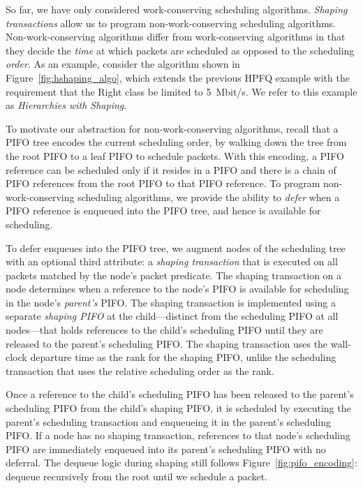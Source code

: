 So far, we have only considered work-conserving scheduling algorithms. {\em
Shaping transactions} allow us to program non-work-conserving scheduling
algorithms. Non-work-conserving algorithms differ from work-conserving
algorithms in that they decide the {\em time} at which packets are scheduled as
opposed to the scheduling {\em order}. As an example, consider the algorithm
shown in Figure~\ref{fig:hshaping_algo}, which extends the previous HPFQ
example with the requirement that the Right class be limited to 5~Mbit/s. We
refer to this example as {\em Hierarchies with Shaping}.

To motivate our abstraction for non-work-conserving algorithms, recall that a
PIFO tree encodes the current scheduling order, by walking down the tree from
the root PIFO to a leaf PIFO to schedule packets.  With this encoding, a PIFO
reference can be scheduled only if it resides in a PIFO and there is a chain of
PIFO references from the root PIFO to that PIFO reference. To program
non-work-conserving scheduling algorithms, we provide the ability to {\em
defer} when a PIFO reference is enqueued into the PIFO tree, and hence is
available for scheduling.

To defer enqueues into the PIFO tree, we augment nodes of the scheduling tree
with an optional third attribute: a {\em shaping transaction} that is executed
on all packets matched by the node's packet predicate. The shaping transaction
on a node determines when a reference to the node's PIFO is available for
scheduling in the node's {\em parent's} PIFO. The shaping transaction is
implemented using a separate {\em shaping PIFO} at the child---distinct from
the scheduling PIFO at all nodes---that holds references to the child's
scheduling PIFO until they are released to the parent's scheduling PIFO.  The
shaping transaction uses the wall-clock departure time as the rank for the
shaping PIFO, unlike the scheduling transaction that uses the relative
scheduling order as the rank.

Once a reference to the child's scheduling PIFO has been released to the
parent's scheduling PIFO from the child's shaping PIFO, it is scheduled by
executing the parent's scheduling transaction and enqueueing it in the parent's
scheduling PIFO. If a node has no shaping transaction, references to that
node's scheduling PIFO are immediately enqueued into its parent's scheduling
PIFO with no deferral.  The dequeue logic during shaping still follows
Figure~\ref{fig:pifo_encoding}: dequeue recursively from the root until we
schedule a packet.

